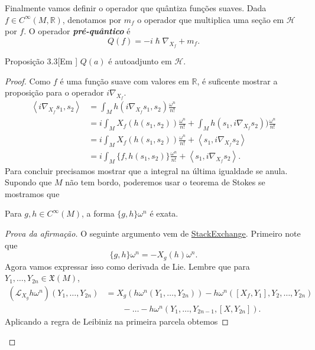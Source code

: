 Finalmente vamos definir o operador que quântiza funções suaves. Dada $f \in C^\infty(M,\mathbb{R})$, denotamos por $m_f$ o operador que multiplica uma seção em $\mathcal{H}$ por $f$. O operador \textit{\textbf{pré-quântico}}  é
\[Q(f)=-i\hslash \nabla_{X_f}+m_f.\]

\begin{thing4}{Proposição 3.3}[Em \cite{wang}]\leavevmode
$Q(a)$ é autoadjunto em $\mathcal{H}$.	
\end{thing4}

\begin{proof}\leavevmode
Como $f$ é uma função suave com valores em $\mathbb{R}$, é suficente mostrar a proposição para o operador $i\nabla_{X_f}$.
\begin{align*}
\left<i\nabla_{X_f}s_1,s_2\right>&=\int_{M}h(i \nabla_{X_f}s_1,s_2)\frac{\omega^n}{n!}\\
&=i \int_{M}X_f(h(s_1,s_2))\frac{\omega^n}{n!}+\int_{M}h(s_1,i\nabla_{X_f}s_2))\frac{\omega^n}{n!}\\
&=i \int_{M}X_f(h(s_1,s_2))\frac{\omega^n}{n!}+\left<s_1,i\nabla_{X_f}s_2\right>\\
&=i \int_{M}\{f,h(s_1,s_2)\}\frac{\omega^n}{n!}+\left<s_1,i \nabla_{X_f}s_2\right>.
\end{align*}
Para concluir precisamos mostrar que a integral na última igualdade se anula. Supondo que $M$  não tem bordo, poderemos usar o teorema de Stokes se mostramos que
\begin{claim}\leavevmode
	Para $g,h \in C^\infty(M)$, a forma $\{g,h\}\omega^n$ é exata.
\end{claim}
\begin{proof}[Prova da afirmação]\leavevmode
O seguinte argumento vem de \href{https://math.stackexchange.com/questions/3532438/integral-of-poisson-bracket-vanishes}{StackExchange}. Primeiro note que
\begin{equation}\label{eq:1}
\{g,h\}\omega^n = -X_g(h)\omega^n.
\end{equation}
Agora vamos expressar isso como derivada de Lie. Lembre que para $Y_1,\ldots,Y_{2n}\in \mathfrak{X}(M)$,
\begin{align*}
	\left(\mathcal{L}_{X_g}h\omega^n\right)(Y_1,\ldots,Y_{2n})&=X_g\left( h \omega^n\left( Y_1,\ldots,Y_{2n} \right)  \right) -h \omega^n\left( [X_f,Y_1],Y_2,\ldots,Y_{2n} \right) \\
								  &  \qquad -\ldots-h \omega^n\left( Y_1,\ldots,Y_{2n-1},[X,Y_{2n}] \right).
\end{align*}
Aplicando a regra de Leibiniz na primeira parcela obtemos

\end{proof}
\end{proof}
